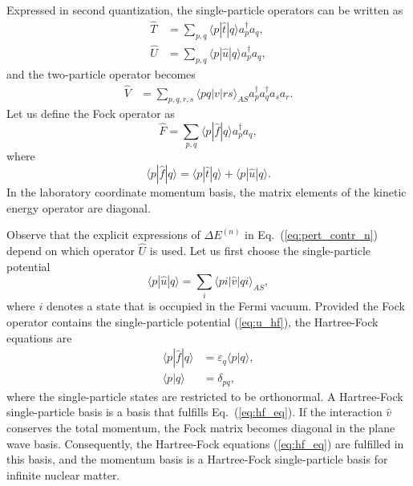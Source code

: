 \documentclass[a4paper,12pt]{report}
\begin{document}
Expressed in second quantization, the single-particle operators can be written as 
\begin{align}
  \hat{T} &= \sum_{p,q}\langle p|\hat{t}|q\rangle a_{p}^{\dagger }a_{q}, \\
  \hat{U} &= \sum_{p,q}\langle p|\hat{u}|q\rangle a_{p}^{\dagger }a_{q},
\end{align}
and the two-particle operator becomes
\begin{align}
  \hat{V} &= \sum_{p,q,r,s}\langle pq|v|rs\rangle_{AS}a_{p}^{\dagger }a_{q}^{\dagger }a_{s}a_{r}.
\end{align}
Let us define the Fock operator as 
\begin{equation}
  \hat{F} = \sum_{p,q}\langle p|\hat{f}|q\rangle a_{p}^{\dagger }a_{q},
\end{equation}
where
\begin{equation} \label{eq:fock_def}
  \langle p|\hat{f}|q\rangle = \langle p|\hat{t}|q\rangle + \langle p|\hat{u}|q\rangle .
\end{equation}
In the laboratory coordinate momentum basis, the matrix elements of the kinetic energy operator are diagonal.

Observe that the explicit expressions of $\Delta E^{(n)}$ in Eq.~(\ref{eq:pert_contr_n}) depend on which operator $\hat{U}$ is used. Let us first choose the single-particle potential
\begin{equation} 
  \langle p|\hat{u}|q\rangle = \sum_{i}\langle pi|\hat{v}|qi\rangle_{AS},
  \label{eq:u_hf}
\end{equation}
where $i$ denotes a state that is occupied in the Fermi vacuum. Provided the Fock operator contains the single-particle potential (\ref{eq:u_hf}), the Hartree-Fock equations \cite{harris} are
\begin{align} 
  \langle p|\hat{f}|q\rangle &= \varepsilon_{q}\langle p|q\rangle , \nonumber \\
  \langle p|q\rangle &= \delta_{pq},
  \label{eq:hf_eq}
\end{align}
where the single-particle states are restricted to be orthonormal. A Hartree-Fock single-particle basis is a basis that fulfills Eq.~(\ref{eq:hf_eq}). If the interaction $\hat{v}$ conserves the total momentum, the Fock matrix becomes diagonal in the plane wave basis. Consequently, the Hartree-Fock equations (\ref{eq:hf_eq}) are fulfilled in this basis, and the momentum basis is a Hartree-Fock single-particle basis for infinite nuclear matter.
\end{document}
